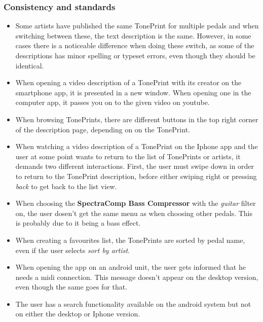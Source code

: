 \subsubsection{Consistency and standards}
\begin{itemize}
	\item Some artists have published the same TonePrint for multiple pedals and when switching between these, the text description is the same. However, in some cases there is a noticeable difference when doing these switch, as some of the descriptions has minor spelling or typeset errors, even though they should be identical.\\
	\item When opening a video description of a TonePrint with its creator on the smartphone app, it is presented in a new window. When opening one in the computer app, it passes you on to the given video on youtube. \\
	\item When browsing TonePrints, there are different buttons in the top right corner of the description page, depending on on the TonePrint.\\
	\item When watching a video description of a TonePrint on the Iphone app and the user at some point wants to return to the list of TonePrints or artists, it demands two different interactions. First, the user must swipe down in order to return to the TonePrint description, before either swiping right or pressing \textit{back} to get back to the list view.\\
	\item When choosing the \textbf{SpectraComp Bass Compressor} with the \textit{guitar} filter on, the user dosen't get the same menu as when choosing other pedals. This is probably due to it being a bass effect.\\
	\item When creating a favourites list, the TonePrints are sorted by pedal name, even if the user selects \textit{sort by artist}.\\
	\item When opening the app on an android unit, the user gets informed that he needs a midi connection. This message doesn't appear on the desktop version, even though the same goes for that.\\
	\item The user has a search functionality available on the android system but not on either the desktop or Iphone version.
\end{itemize}
%
